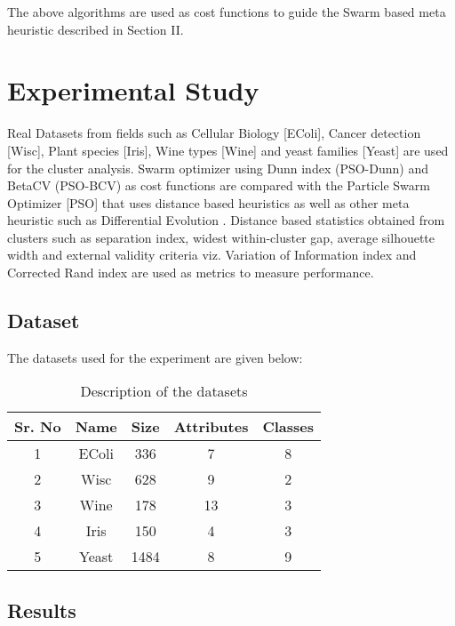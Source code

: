 \documentclass{svproc}
\begin{document}
The above algorithms are used as cost functions to guide the Swarm based meta heuristic described in Section II.

\section{Experimental Study}
Real Datasets from fields such as Cellular Biology [EColi], Cancer detection [Wisc], Plant species [Iris], Wine types [Wine] and yeast families [Yeast] are used for the cluster analysis. Swarm optimizer using Dunn index (PSO-Dunn) and BetaCV (PSO-BCV) as cost functions are compared with the Particle Swarm Optimizer [PSO] that uses distance based heuristics \cite{ppr:8} \cite{ppr:9} \cite{ppr:10} as well as other meta heuristic such as Differential Evolution \cite{ppr:15}. Distance based statistics obtained from clusters such as separation index, widest within-cluster gap, average silhouette width and external validity criteria viz. Variation of Information index \cite{ppr:14} and Corrected Rand index \cite{ppr:13} are used as metrics to measure performance.  


\subsection{Dataset}
The datasets used for the experiment are given below:

\begin{table}[H]
\renewcommand{\arraystretch}{1.3}
\caption{Description of the datasets}
\label{table}
\centering
\begin{tabular}{|c|c|c|c|c|}
  \hline
\multicolumn{1}{|c|}{\textbf{Sr. No}} & \multicolumn{1}{c|}{\textbf{Name}} & \multicolumn{1}{c|}{\textbf{Size}} & \multicolumn{1}{c|}{\textbf{Attributes}} & \multicolumn{1}{c|}{\textbf{Classes}}\\
  \hline
  1 & EColi &  336 & 7 & 8\\
   \hline
  2 & Wisc &  628 & 9 & 2 \\
   \hline
  3 & Wine &  178 & 13 & 3 \\
   \hline
  4 & Iris &  150 & 4 & 3\\
   \hline
  5 & Yeast & 1484 & 8 & 9 \\
   \hline
\end{tabular}
\end{table}


\subsection{Results}
\end{document}
